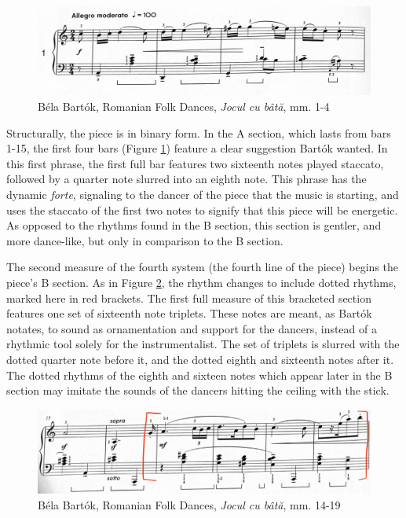 \begin{figure}[h]
  \centering
  \includegraphics[width=\textwidth]{figures/bartok-stick-dance-first-line.jpg}
  \caption{Béla Bartók, Romanian Folk Dances, \textit{Jocul cu bâtă}, mm. 1-4}
  \label{fig:bartok-stick-dance-first-line}
\end{figure}


Structurally, the piece is in binary form. In the A section, which lasts from bars 1-15, the first four bars (Figure \ref{fig:bartok-stick-dance-first-line}\autocite{Lung_2016}) feature a clear suggestion Bartók wanted. In this first phrase, the first full bar features two sixteenth notes played staccato, followed by a quarter note slurred into an eighth note. This phrase has the dynamic \textit{forte}, signaling to the dancer of the piece that the music is starting, and uses the staccato of the first two notes to signify that this piece will be energetic. As opposed to the rhythms found in the B section, this section is gentler, and more dance-like, but only in comparison to the B section. 

The second measure of the fourth system (the fourth line of the piece) begins the piece's B section. As in Figure \ref{fig:bartok-stick-dance-b-section}\autocite{Lung_2016}, the rhythm changes to include dotted rhythms, marked here in red brackets. The first full measure of this bracketed section features one set of sixteenth note triplets. These notes are meant, as Bartók notates, to sound as ornamentation and support for the dancers, instead of a rhythmic tool solely for the instrumentalist. The set of triplets is slurred with the dotted quarter note before it, and the dotted eighth and sixteenth notes after it. The dotted rhythms of the eighth and sixteen notes which appear later in the B section may imitate the sounds of the dancers hitting the ceiling with the stick.

\begin{figure}
  \centering
  \includegraphics[width=\textwidth]{figures/bartok-stick-dance-b-section.jpg}
  \caption{Béla Bartók, Romanian Folk Dances, \textit{Jocul cu bâtă}, mm. 14-19}
  \label{fig:bartok-stick-dance-b-section}
\end{figure}

